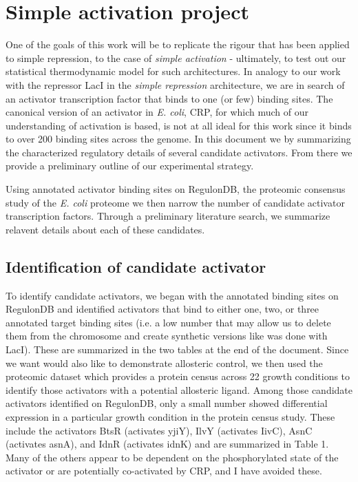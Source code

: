 \documentclass[12pt]{article}
\begin{document}
\section*{Simple activation project}

One of the goals of this work will be to replicate the rigour that has
been applied to simple repression, to the  case of \textit{simple activation} -
ultimately, to test out our statistical thermodynamic model for such
architectures. In analogy to our work with the repressor LacI in the
\textit{simple repression} architecture, we are in search of an activator
transcription factor that binds to one (or few) binding sites. The canonical
version of an activator in \textit{E. coli}, CRP, for which much of our
understanding of activation is based, is not at all ideal for this work since it
binds to over 200 binding sites across the genome.
In this
document we by summarizing the characterized regulatory details of several candidate
activators. From there we provide a preliminary outline of our experimental strategy.

Using annotated activator binding sites on RegulonDB, the
proteomic consensus study of the \textit{E. coli} proteome we then narrow  the
number of candidate activator transcription factors. Through a preliminary
literature search, we summarize relavent details about each of these candidates.

\subsection*{Identification of candidate activator}

To identify candidate activators, we began with the annotated binding sites on RegulonDB
and identified activators that bind to either one, two, or three annotated
target binding sites (i.e. a low number that may allow us to delete them from
the chromosome and create synthetic versions like was done with LacI). These are
summarized in the two tables at the end of the document. Since we want would
also like to demonstrate allosteric control, we then used the proteomic dataset
which provides a protein census across 22 growth conditions to identify those
activators with a potential allosteric ligand. Among those candidate activators
identified on RegulonDB, only a small number showed differential expression in a
particular growth condition in the protein census study. These include the
activators BtsR (activates yjiY), IlvY (activates IivC),  AsnC (activates asnA),
and IdnR (activates idnK) and are summarized in Table 1. Many of the others appear to be dependent on the
phosphorylated state of the activator or are potentially co-activated by CRP,
and I have avoided these.
\newpage
\end{document}
